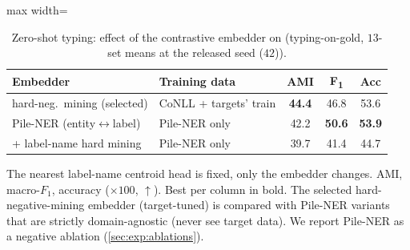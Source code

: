 \begin{table}[tp]
\centering
\caption{Zero-shot typing: effect of the contrastive embedder on \zsind (typing-on-gold, $13$-set means at the released seed ($42$)).}
\label{tab:zs-embedder}
\small
\begin{adjustbox}{max width=\textwidth}
\begin{threeparttable}
\begin{tabular}{llccc}
\toprule
Embedder & Training data & AMI & F\textsubscript{1} & Acc \\
\midrule
hard-neg.\ mining (selected) & CoNLL + targets' train & \textbf{44.4} & 46.8 & 53.6 \\
Pile-NER (entity$\leftrightarrow$label) & Pile-NER only & 42.2 & \textbf{50.6} & \textbf{53.9} \\
\quad + label-name hard mining & Pile-NER only & 39.7 & 41.4 & 44.7 \\
\bottomrule
\end{tabular}
\begin{tablenotes}[flushleft]
\footnotesize
\item The nearest label-name centroid head is fixed, only the embedder changes. AMI, macro-$F_1$, accuracy ($\times100$, $\uparrow$). Best per column in bold. The selected hard-negative-mining embedder (target-tuned) is compared with Pile-NER \cite{zhou2024universalner} variants that are strictly domain-agnostic (never see target data). We report Pile-NER as a negative ablation (\autoref{sec:exp:ablations}).
\end{tablenotes}
\end{threeparttable}
\end{adjustbox}
\end{table}

\FloatBarrier



